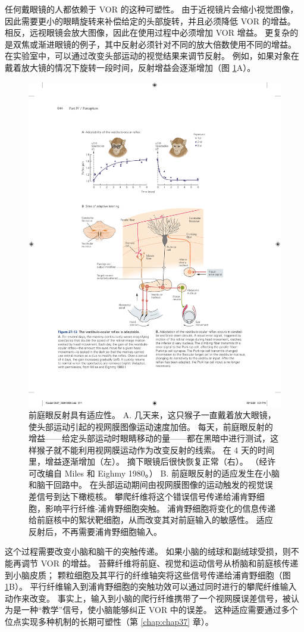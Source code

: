 任何戴眼镜的人都依赖于 VOR 的这种可塑性。 由于近视镜片会缩小视觉图像，因此需要更小的眼睛旋转来补偿给定的头部旋转，并且必须降低 VOR 的增益。 相反，远视眼镜会放大图像，因此在使用过程中必须增加 VOR 增益。 更复杂的是双焦或渐进眼镜的例子，其中反射必须针对不同的放大倍数使用不同的增益。 在实验室中，可以通过改变头部运动的视觉结果来调节反射。 
例如，如果对象在戴着放大镜的情况下旋转一段时间，反射增益会逐渐增加（图 \ref{fig:27_13}A）。

\begin{figure}[htbp]
	\centering
	\includegraphics[width=0.75\linewidth]{chap27/fig_27_13}
	\caption{前庭眼反射具有适应性。 A. 几天来，这只猴子一直戴着放大眼镜，使头部运动引起的视网膜图像运动速度加倍。 每天，前庭眼反射的增益——给定头部运动时眼睛移动的量——都在黑暗中进行测试，这样猴子就不能利用视网膜运动作为改变反射的线索。 在 4 天的时间里，增益逐渐增加（左）。 摘下眼镜后很快恢复正常（右）。 （经许可改编自 Miles 和 Eighmy 1980。） B. 前庭眼反射的适应发生在小脑和脑干回路中。 在头部运动期间由视网膜图像的运动触发的视觉误差信号到达下橄榄核。 攀爬纤维将这个错误信号传递给浦肯野细胞，影响平行纤维-浦肯野细胞突触。 浦肯野细胞将变化的信息传递给前庭核中的絮状靶细胞，从而改变其对前庭输入的敏感性。 适应反射后，不再需要浦肯野细胞输入。}
	\label{fig:27_13}
\end{figure}

这个过程需要改变小脑和脑干的突触传递。 如果小脑的绒球和副绒球受损，则不能再调节 VOR 的增益。 苔藓纤维将前庭、视觉和运动信号从桥脑和前庭核传递到小脑皮质； 颗粒细胞及其平行的纤维轴突将这些信号传递给浦肯野细胞（图 \ref{fig:27_13}B）。 平行纤维输入到浦肯野细胞的突触功效可以通过同时进行的攀爬纤维输入动作来改变。 事实上，输入到小脑的爬行纤维携带了一个视网膜误差信号，被认为是一种“教学”信号，使小脑能够纠正 VOR 中的误差。 这种适应需要通过多个位点实现多种机制的长期可塑性（第 \ref{chap:chap37} 章）。


